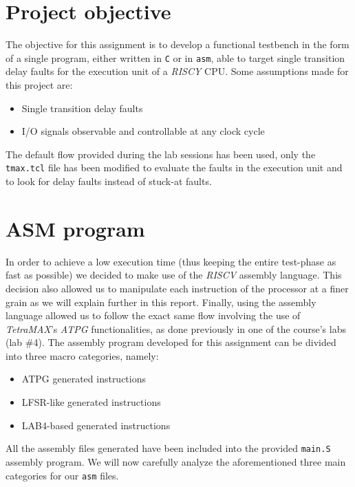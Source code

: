 \documentclass{article}
\begin{document}
\section{Project objective}
The objective for this assignment is to develop a functional testbench in the form of a single program, either written in \texttt{C} or in \texttt{asm}, able to target single transition delay faults for the execution unit of a \emph{RISCY} CPU. Some assumptions made for this project are:
\begin{itemize}
    \item Single transition delay faults
    \item I/O signals observable and controllable at any clock cycle
\end{itemize}
The default flow provided during the lab sessions has been used, only the \texttt{tmax.tcl} file has been modified to evaluate the faults in the execution unit and to look for delay faults instead of stuck-at faults.

%
%

\section{ASM program}
In order to achieve a low execution time (thus keeping the entire test-phase as fast as possible) we decided to make use of the \emph{RISCV} assembly language. This decision also allowed us to manipulate each instruction of the processor at a finer grain as we will explain further in this report. Finally, using the assembly language allowed us to follow the exact same flow involving the use of \emph{TetraMAX}'s \emph{ATPG} functionalities, as done previously in one of the course's labs (lab \#4).
The assembly program developed for this assignment can be divided into three macro categories, namely:
\begin{itemize}
    \item ATPG generated instructions
    \item LFSR-like generated instructions
    \item LAB4-based generated instructions
\end{itemize}
All the assembly files generated have been included into the provided \texttt{main.S} assembly program. We will now carefully analyze the aforementioned three main categories for our \texttt{asm} files.
\end{document}
